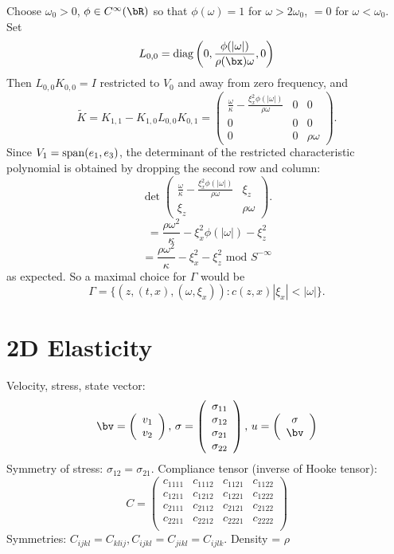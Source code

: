 Choose $\omega_0>0$, $\phi \in C^{\infty}(\bR)$ so that $\phi(\omega) = 1$ for $\omega> 2\omega_0$, $=0$ for $\omega < \omega_0$. Set
\[
  L_{0,0}= {\rm diag}\left(0, \frac{\phi(|\omega|)}{\rho(\bx) \omega}, 0\right)
\]
Then $L_{0,0}K_{0,0} = I$ restricted to $V_0$ and away from zero frequency, and
\[
  \tilde{K} = K_{1,1} - K_{1,0}L_{0,0}K_{0,1} =
  \left(
    \begin{array}{ccc}
      \frac{\omega}{\kappa} - \frac{\xi_x^2\phi(|\omega|)}{\rho \omega} & 0 & 0\\
      0 & 0  & 0 \\
      0 & 0 & \rho \omega
    \end{array}
  \right).
\]
Since $V_1={\rm span}(e_1,e_3)$, the determinant of the restricted characteristic polynomial is obtained by dropping the second row and column:
\[
  \det
  \left(
    \begin{array}{cc}
      \frac{\omega}{\kappa} - \frac{\xi_x^2\phi(|\omega|)}{\rho \omega} &  \xi_z\\
      \xi_z &  \rho \omega
    \end{array}
  \right).
\]
\[
  = \frac{\rho \omega^2 }{\kappa} - \xi_x^2\phi(|\omega|) - \xi_z^2
\]
\[
  = \frac{\rho \omega^2 }{\kappa} - \xi_x^2 - \xi_z^2 \mbox{ mod }  S^{-\infty}
\]  
as expected. So a maximal choice for $\Gamma$ would be
\[
  \Gamma = \{(z,(t,x),(\omega,\xi_x)): c(z,x)|\xi_x| < |\omega|\}.
\]
\section{2D Elasticity}

Velocity, stress, state vector:
\[
  \bv = \left(
    \begin{array}{c}
      v_1 \\
      v_2
    \end{array}
  \right), \,
  \sigma = \left(
    \begin{array}{c}
      \sigma_{11} \\
      \sigma_{12} \\
      \sigma_{21} \\
      \sigma_{22}
    \end{array}
  \right), \, 
  u = \left(
    \begin{array}{c}
      \sigma\\
      \bv
    \end{array}
  \right)
\]
Symmetry of stress: $\sigma_{12}=\sigma_{21}$. Compliance tensor (inverse of Hooke tensor):
\[
  C =\left(
    \begin{array}{cccc}
      c_{1111} &  c_{1112} &  c_{1121} &  c_{1122} \\
      c_{1211} &  c_{1212} &  c_{1221} &  c_{1222} \\
      c_{2111} &  c_{2112} &  c_{2121} &  c_{2122} \\
      c_{2211} &  c_{2212} &  c_{2221} &  c_{2222} \\
    \end{array}
  \right)
\]
Symmetries: $C_{ijkl}=C_{klij}, C_{ijkl}=C_{jikl}=C_{ijlk}$. Density = $\rho$

